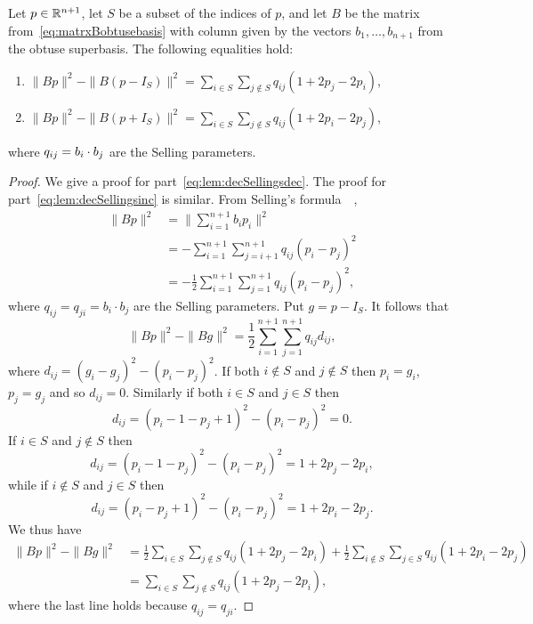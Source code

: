 \documentclass[final,leqno]{siamltex}
\begin{document}
\begin{lemma}\label{lem:decSellings}
Let $p \in {\mathbb R}^{n+1}$, let $S$ be a subset of the indices of $p$, and let $B$ be the matrix from~\eqref{eq:matrxBobtusebasis} with column given by the vectors $b_1,\dots,b_{n+1}$ from the obtuse superbasis.  The following equalities hold:
\begin{enumerate}
\item  ${\displaystyle \|Bp\|^2 - \|B(p - I_S)\|^2 = \sum_{i \in S}\sum_{j \notin S}q_{ij}(1 + 2p_j - 2p_i)}$, \label{eq:lem:decSellingsdec}
\item  ${\displaystyle \|Bp\|^2 - \|B(p + I_S)\|^2 = \sum_{i \in S}\sum_{j \notin S}q_{ij}(1 + 2p_i - 2p_j)}$, \label{eq:lem:decSellingsinc}
\end{enumerate}
where $q_{ij} = b_i \cdot b_j$ are the Selling parameters.
\end{lemma}
\begin{proof}
We give a proof for part~\ref{eq:lem:decSellingsdec}.  The proof for part~\ref{eq:lem:decSellingsinc} is similar.  From Selling's formula~\cite[Proposition 2.3.1]{Valentin2003_coverings_tilings_low_dimension}~\cite{Selling1874},
\begin{align*}
\|Bp\|^2 &= \| \sum_{i=1}^{n+1} b_i p_i \|^2 \\
&= - \sum_{i=1}^{n+1}\sum_{j=i+1}^{n+1}q_{ij}(p_i - p_j)^2 \\
&= - \frac{1}{2} \sum_{i=1}^{n+1}\sum_{j=1}^{n+1}q_{ij}(p_i - p_j)^2, 
\end{align*}
where $q_{ij} = q_{ji} = b_i \cdot b_j$ are the Selling parameters.  Put $g = p - I_S$.  It follows that
\[
\|Bp\|^2 - \|Bg\|^2 = \frac{1}{2} \sum_{i=1}^{n+1}\sum_{j=1}^{n+1}q_{ij}d_{ij},
\]
where $d_{ij} = (g_i - g_j)^2 - (p_i - p_j)^2$.  If both $i \notin S$ and $j \notin S$ then $p_i = g_i$, $p_j = g_j$ and so $d_{ij} = 0$.  Similarly if both $i \in S$ and $j \in S$ then 
\[
d_{ij} = (p_i-1 - p_j+1)^2 - (p_i - p_j)^2 = 0.
\]
If $i \in S$ and $j \notin S$ then
\[
d_{ij} = (p_i-1 - p_j)^2 - (p_i - p_j)^2= 1 + 2p_j - 2p_i,
\]
while if $i \notin S$ and $j \in S$ then
\[
d_{ij} = (p_i - p_j+1)^2 - (p_i - p_j)^2 = 1 + 2p_i - 2p_j.
\]
We thus have
\begin{align*}
\|Bp\|^2 - \|Bg\|^2 &= \frac{1}{2} \sum_{i \in S}\sum_{j \notin S}q_{ij}(1 + 2p_j - 2p_i) + \frac{1}{2} \sum_{i \notin S}\sum_{j \in S}q_{ij}(1 + 2p_i - 2p_j) \\
&= \sum_{i \in S}\sum_{j \notin S}q_{ij}(1 + 2p_j - 2p_i),
\end{align*}
where the last line holds because $q_{ij} = q_{ji}$.
\end{proof}
\end{document}
